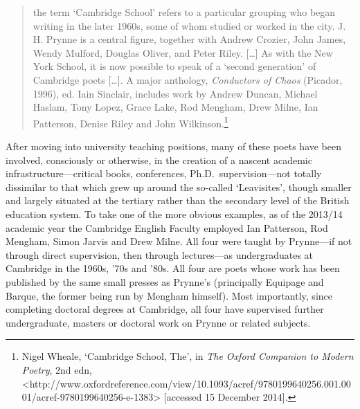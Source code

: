 \documentclass[]{article}
\begin{document}
\begin{quote}
\singlespacing the term ‘Cambridge School’ refers to a particular
grouping who began writing in the later 1960s, some of whom studied or
worked in the city. J. H. Prynne is a central figure, together with
Andrew Crozier, John James, Wendy Mulford, Douglas Oliver, and Peter
Riley. {[}\ldots{}{]} As with the New York School, it is now possible to
speak of a ‘second generation’ of Cambridge poets {[}\ldots{}{]}. A
major anthology, \emph{Conductors of Chaos} (Picador, 1996), ed. Iain
Sinclair, includes work by Andrew Duncan, Michael Haslam, Tony Lopez,
Grace Lake, Rod Mengham, Drew Milne, Ian Patterson, Denise Riley and
John Wilkinson.\footnote{Nigel Wheale, ‘Cambridge School, The’, in
  \emph{The Oxford Companion to Modern Poetry}, 2nd edn,
  \textless{}http://www.oxfordreference.com/view/10.1093/acref/9780199640256.001.0001/acref-9780199640256-e-1383\textgreater{}
  {[}accessed 15 December 2014{]}.}
\end{quote}

\noindent After moving into university teaching positions, many of these
poets have been involved, consciously or otherwise, in the creation of a
nascent academic infrastructure—critical books, conferences,
Ph.D.~supervision—not totally dissimilar to that which grew up around
the so-called ‘Leavisites’, though smaller and largely situated at the
tertiary rather than the secondary level of the British education
system. To take one of the more obvious examples, as of the 2013/14
academic year the Cambridge English Faculty employed Ian Patterson, Rod
Mengham, Simon Jarvis and Drew Milne. All four were taught by Prynne—if
not through direct supervision, then through lectures—as undergraduates
at Cambridge in the 1960s, ’70s and ’80s. All four are poets whose work
has been published by the same small presses as Prynne’s (principally
Equipage and Barque, the former being run by Mengham himself). Most
importantly, since completing doctoral degrees at Cambridge, all four
have supervised further undergraduate, masters or doctoral work on
Prynne or related subjects.
\end{document}
